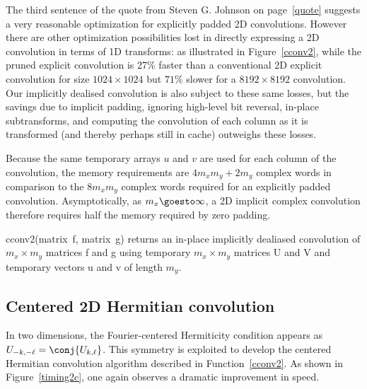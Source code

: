 \documentclass[final]{siamltex}
\begin{document}
The third sentence of the quote from Steven G. Johnson
on page~\ref{quote} suggests a very reasonable optimization
for explicitly padded 2D convolutions.
However there are other optimization possibilities lost in directly
expressing a 2D convolution in terms of 1D transforms: as illustrated in
Figure~\ref{cconv2}, while the pruned explicit convolution is 27\% faster
than a conventional 2D explicit convolution for size $1024\times 1024$ but
$71\%$ slower for a $8192\times 8192$ convolution. Our implicitly dealised
convolution is also subject to these same losses, but the savings due to
implicit padding, ignoring high-level bit reversal, in-place subtransforms, 
and computing the convolution of each column as it is transformed (and
thereby perhaps still in cache) outweighs these losses.

Because the same temporary arrays $u$ and $v$ are used for each column
of the convolution, the memory requirements are $4m_xm_y+2m_y$ complex
words in comparison to the $8m_xm_y$ complex words required for an
explicitly padded convolution. Asymptotically, as $m_x\goesto\infty$,
a 2D implicit complex convolution therefore requires half the memory
required by zero padding.


\begin{function}[htbp]
  \Return \xf\;
\caption{cconv2(matrix~{\sf f}, matrix~{\sf g}) 
returns an in-place implicitly dealiased convolution of
$m_x\times m_y$ matrices {\sf f} and {\sf g} using temporary $m_x\times m_y$
matrices {\sf U} and {\sf V} and temporary vectors {\sf u} and {\sf v} of
length $m_y$.}\label{cconv2}
\end{function}

\subsection{Centered 2D Hermitian convolution}

In two dimensions, the Fourier-centered Hermiticity condition appears as
$U_{-k,-\ell}=\conj{U_{k,\ell}}$. 
This symmetry is exploited to develop the centered Hermitian convolution
algorithm described in Function~\ref{cconv2}. As shown in
Figure~\ref{timing2c}, one again observes a dramatic improvement in speed.
\end{document}
